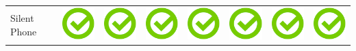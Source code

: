 \documentclass[10pt,foldmark,tumble]{leaflet}
\begin{document}
\begin{center}
{{\begin{tabular}{ L{2cm} | C{2cm} | C{2cm} | C{2cm} | C{2cm} | C{2cm} | C{2cm} | C{2cm} }
Silent Phone & \includegraphics[scale=0.1]{pics/haken.png} & \includegraphics[scale=0.1]{pics/haken.png} & \includegraphics[scale=0.1]{pics/haken.png} & \includegraphics[scale=0.1]{pics/haken.png} & \includegraphics[scale=0.1]{pics/haken.png} & \includegraphics[scale=0.1]{pics/haken.png} & \includegraphics[scale=0.1]{pics/haken.png} \tabularnewline

\end{tabular}}}
\end{center}
\end{document}
